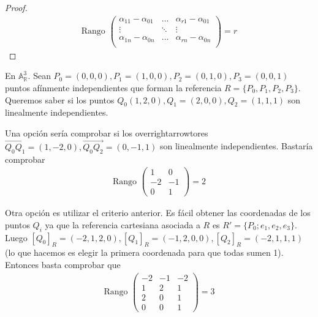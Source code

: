 \documentclass[14pt]{book}
\begin{document}
\begin{proof}
	\begin{align*}
		\text{Rango }\left(\begin{array}{ccc}
		\alpha_{11} - \alpha_{01} & \dots & \alpha_{r1} - \alpha_{01} \\
		\vdots & \ddots & \vdots \\
		\alpha_{1n} - \alpha_{0n} & \dots & \alpha_{rn} - \alpha_{0n} \\
		\end{array}
		\right) = r
	\end{align*} 
\end{proof}

\begin{ej}
	En $\mathbb{A}_\mathbb{R}^3$. Sean $P_0 = (0,0,0), P_1 = (1,0,0), P_2 = (0,1,0), P_3 = (0,0,1)$ puntos afínmente independientes que forman la referencia $R = \{P_0, P_1, P_2, P_3\}$. Queremos saber si los puntos $Q_0 (1, 2, 0), Q_1 = (2, 0, 0), Q_2  = (1,1,1)$ son linealmente independientes.
	
	Una opción sería comprobar si los overrightarrowtores $\overrightarrow{Q_0 Q_1} = (1, -2, 0), \overrightarrow{Q_0 Q_2} = (0, -1, 1)$ son linealmente independientes. Bastaría comprobar
	\begin{align*}
		\text{Rango }\left(\begin{array}{cc}
		1 & 0 \\ -2 & -1 \\ 0 & 1
		\end{array}\right) = 2
	\end{align*}
	
	Otra opción es utilizar el criterio anterior. Es fácil obtener las coordenadas de los puntos $Q_i$ ya que la referencia cartesiana asociada a $R$ es $R' = \{P_0; e_1, e_2, e_3\}$. Luego $[Q_0]_R = (-2, 1, 2, 0), [Q_1]_R = (-1, 2, 0, 0), [Q_2]_R = (-2, 1, 1, 1)$ (lo que hacemos es elegir la primera coordenada para que todas sumen 1). Entonces basta comprobar que
	\begin{align*}
		\text{Rango }\left(\begin{array}{ccc}
		-2 & -1 & -2 \\
		1 & 2 & 1 \\
		2 & 0 & 1 \\
		0 & 0 & 1
		\end{array}\right) = 3
	\end{align*}
\end{ej}
\end{document}
